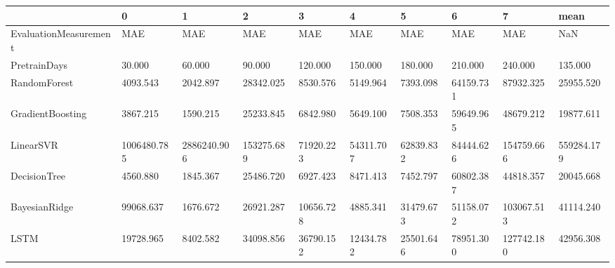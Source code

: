 \begin{tabular}{llllllllll}
\toprule
{} &           0 &           1 &          2 &         3 &         4 &         5 &         6 &          7 &       mean \\
\midrule
EvaluationMeasurement &         MAE &         MAE &        MAE &       MAE &       MAE &       MAE &       MAE &        MAE &        NaN \\
PretrainDays          &      30.000 &      60.000 &     90.000 &   120.000 &   150.000 &   180.000 &   210.000 &    240.000 &    135.000 \\
RandomForest          &    4093.543 &    2042.897 &  28342.025 &  8530.576 &  5149.964 &  7393.098 & 64159.731 &  87932.325 &  25955.520 \\
GradientBoosting      &    3867.215 &    1590.215 &  25233.845 &  6842.980 &  5649.100 &  7508.353 & 59649.965 &  48679.212 &  19877.611 \\
LinearSVR             & 1006480.785 & 2886240.906 & 153275.689 & 71920.223 & 54311.707 & 62839.832 & 84444.626 & 154759.666 & 559284.179 \\
DecisionTree          &    4560.880 &    1845.367 &  25486.720 &  6927.423 &  8471.413 &  7452.797 & 60802.387 &  44818.357 &  20045.668 \\
BayesianRidge         &   99068.637 &    1676.672 &  26921.287 & 10656.728 &  4885.341 & 31479.673 & 51158.072 & 103067.513 &  41114.240 \\
LSTM                  &   19728.965 &    8402.582 &  34098.856 & 36790.152 & 12434.782 & 25501.646 & 78951.300 & 127742.180 &  42956.308 \\
\bottomrule
\end{tabular}
